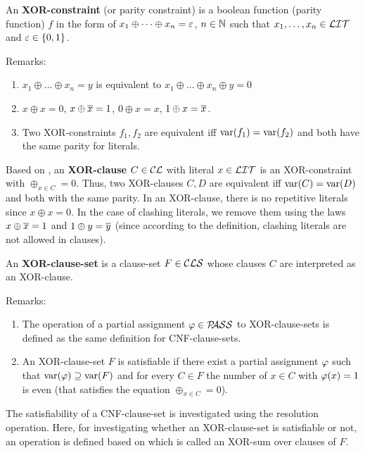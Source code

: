 \documentclass{report}
\begin{document}
\begin{defi}\label{def:xor-const} 
An \textbf{XOR-constraint} (or parity constraint) is a boolean function (parity function) $f$ in the form of $x_1 \oplus \dots \oplus x_n = \varepsilon$, $n \in \mathbb{N}$ such that $x_1, \dots, x_n \in \mathcal{LIT}$ and $\varepsilon \in \{ 0,1 \}$.
\end{defi}

Remarks:
\begin{enumerate}
    \item $x_1 \oplus \dots \oplus x_n = y$ is equivalent to $x_1 \oplus \dots \oplus x_n \oplus y = 0$
    \item $x \oplus x = 0$, $x \oplus \overline{x} = 1$, $0 \oplus x = x$, $1 \oplus x = \overline{x}$.
    \item Two XOR-constraints $f_1, f_2$ are equivalent iff $\operatorname{var}(f_1) = \operatorname{var}(f_2)$ and both have the same parity for literals.
\end{enumerate}

\begin{defi}\label{def:xor-cls}
Based on \cite{GwynneKullmann2013GoodRepresentationsIIex}, an \textbf{XOR-clause} $C \in \mathcal{CL}$ with literal $x \in \mathcal{LIT}$ is an XOR-constraint with $\oplus_{x \in C} = 0$. Thus, two XOR-clauses $C, D$ are equivalent iff $\operatorname{var}(C) = \operatorname{var}(D)$ and both with the same parity. In an XOR-clause, there is no repetitive literals since $x \oplus x = 0$. In the case of clashing literals, we remove them using the laws $x \oplus \overline{x} = 1$ and $1 \oplus y = \overline{y}$ (since according to the definition, clashing literals are not allowed in clauses).

An \textbf{XOR-clause-set} is a clause-set $F \in \mathcal{CLS}$ whose clauses $C$ are interpreted as an XOR-clause.  
\end{defi} 

Remarks:
\begin{enumerate}
  \item The operation of a partial assignment $\varphi \in \mathcal{P\hspace{-0.32em}ASS}$ to XOR-clause-sets is defined as the same definition for CNF-clause-sets.
  \item An XOR-clause-set $F$ is satisfiable if there exist a partial assignment $\varphi$ such that $\operatorname{var}(\varphi) \supseteq \operatorname{var}(F)$ and for every $C \in F$ the number of $x \in C$ with $\varphi(x) = 1$ is even (that satisfies the equation  $\oplus_{x \in C} = 0$).
\end{enumerate}

The satisfiability of a CNF-clause-set is investigated using the resolution operation. Here, for investigating whether an XOR-clause-set is satisfiable or not, an operation is defined based on \cite{GwynneKullmann2013GoodRepresentationsIIex,GwynneKullmann2013GoodRepresentationsIILata} which is called an XOR-sum over clauses of $F$.
\end{document}
